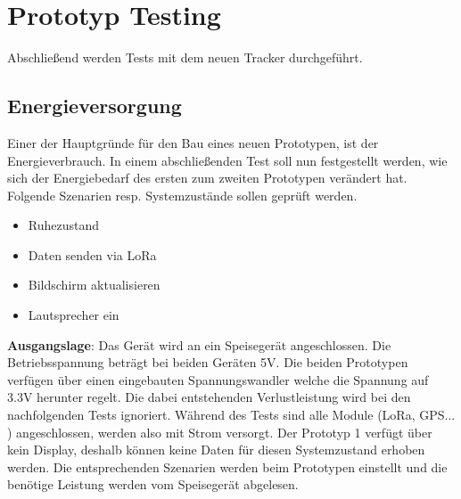 \documentclass[11pt,english,german]{report}
\theoremstyle{definition}
\begin{document}
\newpage
\section{Prototyp Testing}
Abschließend werden Tests mit dem neuen Tracker durchgeführt.

\subsection{Energieversorgung}
Einer der Hauptgründe für den Bau eines neuen Prototypen, ist der Energieverbrauch. In einem abschließenden Test soll nun festgestellt werden, wie sich der Energiebedarf des ersten zum zweiten Prototypen verändert hat. Folgende Szenarien resp. Systemzustände sollen geprüft werden.
\begin{itemize}
	\item Ruhezustand
	\item Daten senden via LoRa
	\item Bildschirm aktualisieren
	\item Lautsprecher ein	
\end{itemize}
\textbf{Ausgangslage}: Das Gerät wird an ein Speisegerät angeschlossen. Die Betriebsspannung beträgt bei beiden Geräten 5V. Die beiden Prototypen verfügen über einen eingebauten Spannungswandler welche die Spannung auf 3.3V herunter regelt. Die dabei entstehenden Verlustleistung wird bei den nachfolgenden Tests ignoriert. Während des Tests sind alle Module (LoRa, GPS... ) angeschlossen, werden also mit Strom versorgt. Der Prototyp 1 verfügt über kein Display, deshalb können keine Daten für diesen Systemzustand erhoben werden. Die entsprechenden Szenarien werden beim Prototypen einstellt und die benötige Leistung werden vom Speisegerät abgelesen.
\end{document}
